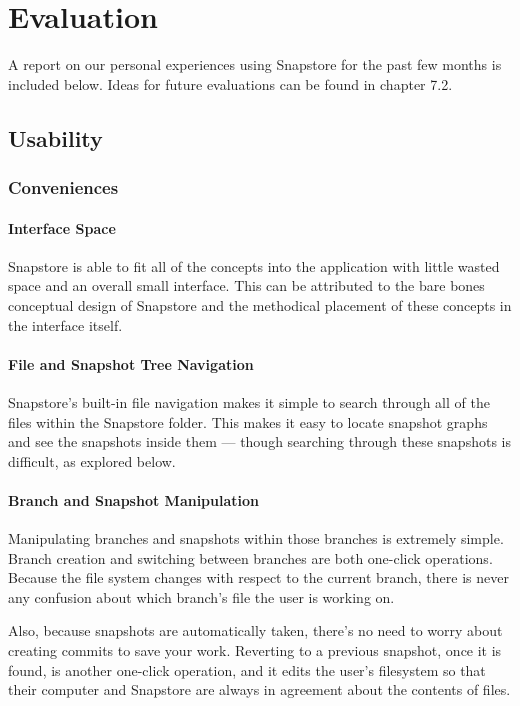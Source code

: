 \chapter{Evaluation}

A report on our personal experiences using Snapstore for the past few months is included below. Ideas for future evaluations can be found in chapter 7.2.

\section{Usability}

\subsection{Conveniences}

\subsubsection{Interface Space}

Snapstore is able to fit all of the concepts into the application with little wasted space and an overall small interface. This can be attributed to the bare bones conceptual design of Snapstore and the methodical placement of these concepts in the interface itself.

\subsubsection{File and Snapshot Tree Navigation}

Snapstore's built-in file navigation makes it simple to search through all of the files within the Snapstore folder. This makes it easy to locate snapshot graphs and see the snapshots inside them --- though searching through these snapshots is difficult, as explored below.

\subsubsection{Branch and Snapshot Manipulation}

Manipulating branches and snapshots within those branches is extremely simple. Branch creation and switching between branches are both one-click operations. Because the file system changes with respect to the current branch, there is never any confusion about which branch's file the user is working on.

Also, because snapshots are automatically taken, there's no need to worry about creating commits to save your work. Reverting to a previous snapshot, once it is found, is another one-click operation, and it edits the user's filesystem so that their computer and Snapstore are always in agreement about the contents of files.


